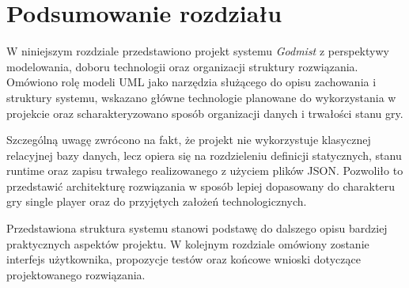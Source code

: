 \section{Podsumowanie rozdziału}
\label{sec:podsumowanie-rozdzialu-2}

W niniejszym rozdziale przedstawiono projekt systemu \emph{Godmist} z perspektywy modelowania, doboru technologii oraz organizacji struktury rozwiązania. Omówiono rolę modeli UML jako narzędzia służącego do opisu zachowania i struktury systemu, wskazano główne technologie planowane do wykorzystania w projekcie oraz scharakteryzowano sposób organizacji danych i trwałości stanu gry.

Szczególną uwagę zwrócono na fakt, że projekt nie wykorzystuje klasycznej relacyjnej bazy danych, lecz opiera się na rozdzieleniu definicji statycznych, stanu runtime oraz zapisu trwałego realizowanego z użyciem plików JSON. Pozwoliło to przedstawić architekturę rozwiązania w sposób lepiej dopasowany do charakteru gry single player oraz do przyjętych założeń technologicznych.

Przedstawiona struktura systemu stanowi podstawę do dalszego opisu bardziej praktycznych aspektów projektu. W kolejnym rozdziale omówiony zostanie interfejs użytkownika, propozycje testów oraz końcowe wnioski dotyczące projektowanego rozwiązania.

